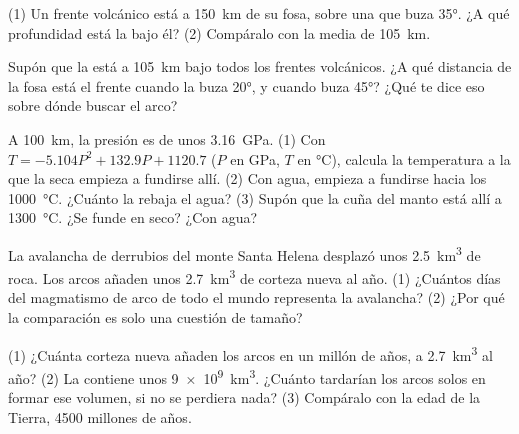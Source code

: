 \begin{exercise}[$\star\star$]\label{exo:g12:subduction-magmatism:6}
(1) Un frente volcánico está a \qty{150}{km} de su fosa, sobre una  que
buza \ang{35}. ¿A qué profundidad está la  bajo él? (2) Compáralo con la
media de \qty{105}{km}.
\end{exercise}

\begin{exercise}[$\star\star$]\label{exo:g12:subduction-magmatism:7}
Supón que la  está a \qty{105}{km} bajo todos los frentes volcánicos. ¿A
qué distancia de la fosa está el frente cuando la  buza \ang{20}, y cuando
buza \ang{45}? ¿Qué te dice eso sobre dónde buscar el arco?
\end{exercise}

\begin{exercise}[$\star\star$]\label{exo:g12:subduction-magmatism:8}
A \qty{100}{km}, la presión es de unos \qty{3.16}{GPa}. (1) Con $T =
-5.104P^2 + 132.9P + 1120.7$ ($P$ en \unit{GPa}, $T$ en \unit{\celsius}),
calcula la temperatura a la que la  seca empieza a fundirse allí.
(2) Con agua, empieza a fundirse hacia los \qty{1000}{\celsius}. ¿Cuánto la
rebaja el agua? (3) Supón que la cuña del manto está allí a
\qty{1300}{\celsius}. ¿Se funde en seco? ¿Con agua?
\end{exercise}

\begin{exercise}[$\star\star$]\label{exo:g12:subduction-magmatism:9}
La avalancha de derrubios del monte Santa Helena desplazó unos
\qty{2.5}{km^3} de roca. Los arcos añaden unos \qty{2.7}{km^3} de corteza
nueva al año. (1) ¿Cuántos días del magmatismo de arco de todo el mundo
representa la avalancha? (2) ¿Por qué la comparación es solo una cuestión de
tamaño?
\end{exercise}

\begin{exercise}[$\star\star$]\label{exo:g12:subduction-magmatism:10}
(1) ¿Cuánta corteza nueva añaden los arcos en un millón de años, a
\qty{2.7}{km^3} al año? (2) La  contiene unos
\qty{9e9}{km^3}. ¿Cuánto tardarían los arcos solos en formar ese volumen, si
no se perdiera nada? (3) Compáralo con la edad de la Tierra, 4500 millones de
años.
\end{exercise}

